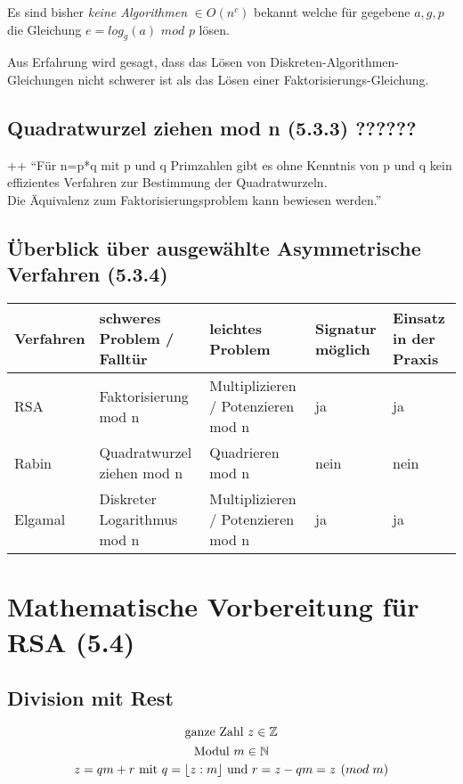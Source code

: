 Es sind bisher \emph{keine Algorithmen} $\in O(n^c)$ bekannt welche für gegebene $a,g,p$ die Gleichung $e = log_g(a) \hspace{4pt} mod \hspace{4pt} p$ lösen.

Aus Erfahrung wird gesagt, dass das Lösen von Diskreten-Algorithmen-Gleichungen nicht schwerer ist als das Lösen einer Faktorisierungs-Gleichung.


\subsection{Quadratwurzel ziehen mod n (5.3.3) ??????}++
"`Für n=p*q mit p und q Primzahlen gibt es ohne Kenntnis von p und q kein effizientes Verfahren zur Bestimmung der Quadratwurzeln.\\
Die Äquivalenz zum Faktorisierungsproblem kann bewiesen werden."'

\subsection{Überblick über ausgewählte Asymmetrische Verfahren (5.3.4)}
\begin{tabularx}{\textwidth}{p{}p{}p{}p{}p{}}
Verfahren & schweres Problem / Falltür & leichtes Problem & Signatur möglich & Einsatz in der Praxis \\ \hline
RSA & Faktorisierung mod n & Multiplizieren / Potenzieren mod n & ja & ja \\ \hline
Rabin & Quadratwurzel ziehen mod n & Quadrieren mod n & nein & nein \\ \hline
Elgamal & Diskreter Logarithmus mod n & Multiplizieren / Potenzieren mod n & ja & ja \\
\end{tabularx}

\section{Mathematische Vorbereitung für RSA (5.4)}
\subsection{Division mit Rest}
$$
\textnormal{ganze Zahl } z \in \mathbb{Z}
$$
$$
 \textnormal{Modul } m \in \mathbb{N}
$$
$$
z = qm + r \textnormal{ mit } q = \lfloor z : m \rfloor \textnormal{ und } r = z - qm = z \hspace{4pt} (mod \hspace{3pt} m) 
$$

